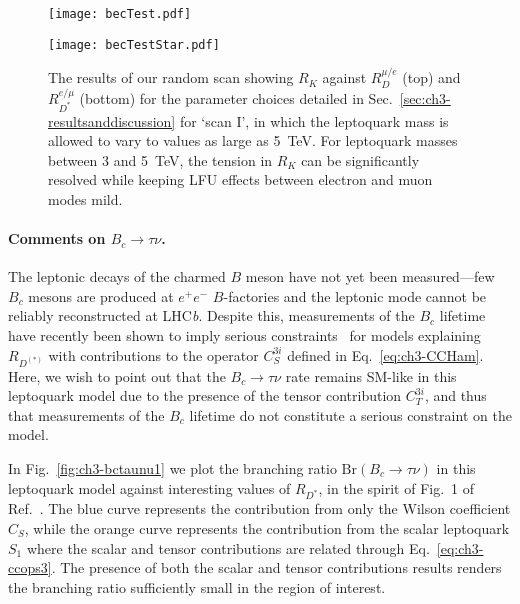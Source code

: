\begin{figure}
  \centering
  \begin{minipage}[t]{1\linewidth}
    \centering \texttt{[image: becTest.pdf]}
  \end{minipage}
  \hfill
  \begin{minipage}[t]{1\linewidth}
    \centering \texttt{[image: becTestStar.pdf]}
  \end{minipage}
  \caption[The results of our random scan showing $R_K$ against $R_D^{\mu/e}$
  (top) and $R^{e/\mu}_{D^*}$ (bottom) for the parameter choices detailed in
  Sec.~\ref{sec:ch3-resultsanddiscussion} for `scan I', in which the leptoquark
  mass is allowed to vary to values as large as \SI{5}{\TeV}.]{The results of
    our random scan showing $R_K$ against $R_D^{\mu/e}$ (top) and
    $R^{e/\mu}_{D^*}$ (bottom) for the parameter choices detailed in
    Sec.~\ref{sec:ch3-resultsanddiscussion} for `scan I', in which the
    leptoquark mass is allowed to vary to values as large as \SI{5}{\TeV}. For
    leptoquark masses between 3 and \SI{5}{\TeV}, the tension in $R_K$ can be
    significantly resolved while keeping LFU effects between electron and muon
    modes mild.}
  \label{fig:ch3-LFUratios}
\end{figure}

\paragraph{Comments on $B_c \to \tau \nu$.} The leptonic decays of the charmed
$B$ meson have not yet been measured---few $B_c$ mesons are produced at $e^+e^-$
$B$-factories and the leptonic mode cannot be reliably reconstructed at
LHC\textit{b}. Despite this, measurements of the $B_c$ lifetime have recently
been shown to imply serious constraints~\cite{Li:2016vvp, Alonso:2016oyd} for
models explaining $R_{D^{(*)}}$ with contributions to the operator $C_S^{3i}$
defined in Eq.~\eqref{eq:ch3-CCHam}. Here, we wish to point out that the $B_c \to
\tau \nu$ rate remains SM-like in this leptoquark model due to the presence of
the tensor contribution $C_T^{3i}$, and thus that measurements of the $B_c$
lifetime do not constitute a serious constraint on the model.

In Fig.~\ref{fig:ch3-bctaunu1} we plot the branching ratio
$\text{Br}(B_c \to \tau \nu)$ in this leptoquark model against interesting
values of $R_{D^*}$, in the spirit of Fig.~1 of Ref.~\cite{Alonso:2016oyd}. The
blue curve represents the contribution from only the Wilson coefficient $C_S$,
while the orange curve represents the contribution from the scalar leptoquark
$S_{1}$ where the scalar and tensor contributions are related through
Eq.~\eqref{eq:ch3-ccops3}. The presence of both the scalar and tensor
contributions results renders the branching ratio sufficiently small in the
region of interest.

